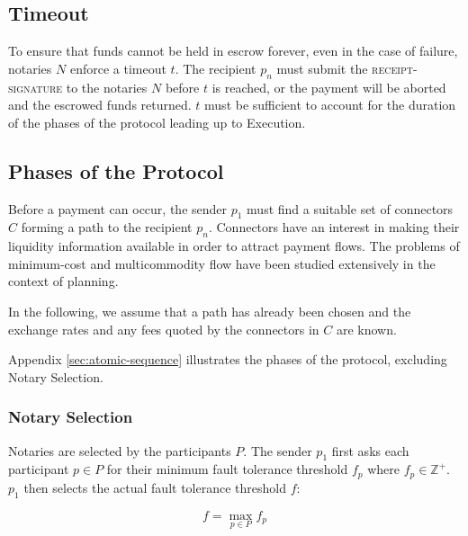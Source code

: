 \documentclass[letterpaper,twocolumn,10pt]{article}
\begin{document}
\subsection{Timeout}
\label{subsec:timeout}


To ensure that funds cannot be held in escrow forever, even in the case of failure, notaries $N$ enforce a timeout $t$. The recipient $p_n$ must submit the \textsc{receipt-signature} to the notaries $N$ before $t$ is reached, or the payment will be aborted and the escrowed funds returned. $t$ must be sufficient to account for the duration of the phases of the protocol leading up to Execution.

\subsection{Phases of the Protocol}

Before a payment can occur, the sender $p_1$ must find a suitable set of connectors $C$ forming a path to the recipient $p_n$. Connectors have an interest in making their liquidity information available in order to attract payment flows. The problems of minimum-cost and multicommodity flow have been studied extensively in the context of planning. \cite{ahuja1988network} \cite{cai2001time} \cite{wagner1959class}

In the following, we assume that a path has already been chosen and the exchange rates and any fees quoted by the connectors in $C$ are known.

Appendix \ref{sec:atomic-sequence} illustrates the phases of the protocol, excluding Notary Selection.

\subsubsection{Notary Selection}
\label{subsec:notary-selection}


Notaries are selected by the participants $P$. The sender $p_1$ first asks each participant $p \in P$  for their minimum fault tolerance threshold $f_p$ where $f_p \in \mathbb{Z}^+$. $p_1$ then selects the actual fault tolerance threshold $f$:

\begin{equation}
f = \max_{p \in P} f_p
\end{equation}
\end{document}
